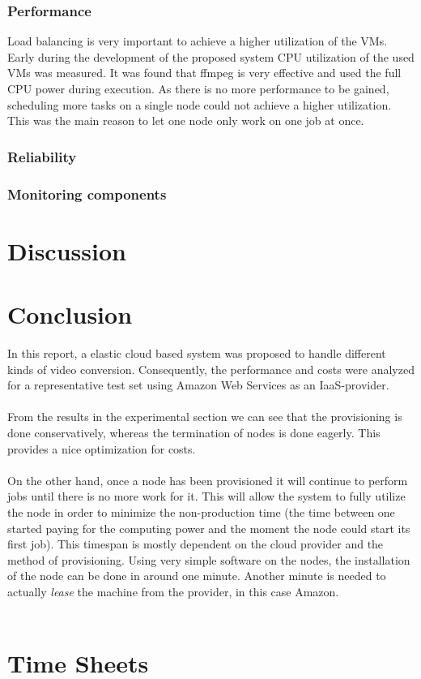 \documentclass[a4paper]{IEEEtran}
\begin{document}
\subsubsection{Performance}
Load balancing is very important to achieve a higher utilization of the VMs.
Early during the development of the proposed system CPU utilization of the used VMs was measured.
It was found that ffmpeg is very effective and used the full CPU power during execution.
As there is no more performance to be gained, scheduling more tasks on a single node could not achieve a higher utilization.
This was the main reason to let one node only work on one job at once.

\subsubsection{Reliability}

\subsubsection{Monitoring components}


\section{Discussion}

\section{Conclusion}

In this report, a elastic cloud based system was proposed to handle different kinds of video conversion.
Consequently, the performance and costs were analyzed for a representative test set using Amazon Web Services as an IaaS-provider.
\\
\\
From the results in the experimental section we can see that the provisioning is done conservatively, whereas the termination of nodes is done eagerly.
This provides a nice optimization for costs.
\\
\\
On the other hand, once a node has been provisioned it will continue to perform jobs until there is no more work for it. 
This will allow the system to fully utilize the node in order to minimize the non-production time (the time between one started paying for the computing power and the moment the node could start its first job).
This timespan is mostly dependent on the cloud provider and the method of provisioning.
Using very simple software on the nodes, the installation of the node can be done in around one minute.
Another minute is needed to actually \textit{lease} the machine from the provider, in this case Amazon.
\\
\\






\appendix
\section{Time Sheets}
\end{document}
